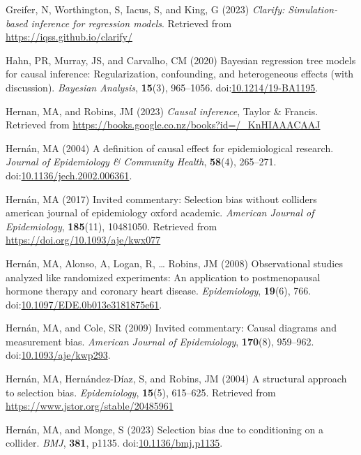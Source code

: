 \documentclass[
  singlecolumn]{article}
\newlength{\cslhangindent}
\newenvironment{CSLReferences}[2] %
 {\begin{list}{}{%
  \setlength{\itemindent}{0pt}
  \setlength{\leftmargin}{0pt}
  \setlength{\parsep}{0pt}
  \ifodd #1
   \setlength{\leftmargin}{\cslhangindent}
   \setlength{\itemindent}{-1\cslhangindent}
  \fi
  \setlength{\itemsep}{#2\baselineskip}}}
 {\end{list}}
\begin{document}
\begin{CSLReferences}{1}{0}
Greifer, N, Worthington, S, Iacus, S, and King, G (2023) \emph{Clarify:
Simulation-based inference for regression models}. Retrieved from
\url{https://iqss.github.io/clarify/}

Hahn, PR, Murray, JS, and Carvalho, CM (2020) Bayesian regression tree
models for causal inference: Regularization, confounding, and
heterogeneous effects (with discussion). \emph{Bayesian Analysis},
\textbf{15}(3), 965--1056.
doi:\href{https://doi.org/10.1214/19-BA1195}{10.1214/19-BA1195}.

Hernan, MA, and Robins, JM (2023) \emph{Causal inference}, Taylor \&
Francis. Retrieved from
\url{https://books.google.co.nz/books?id=/_KnHIAAACAAJ}

Hernán, MA (2004) A definition of causal effect for epidemiological
research. \emph{Journal of Epidemiology \& Community Health},
\textbf{58}(4), 265--271.
doi:\href{https://doi.org/10.1136/jech.2002.006361}{10.1136/jech.2002.006361}.

Hernán, MA (2017) Invited commentary: Selection bias without colliders
\textbar{} american journal of epidemiology \textbar{} oxford academic.
\emph{American Journal of Epidemiology}, \textbf{185}(11), 10481050.
Retrieved from \url{https://doi.org/10.1093/aje/kwx077}

Hernán, MA, Alonso, A, Logan, R, \ldots{} Robins, JM (2008)
Observational studies analyzed like randomized experiments: An
application to postmenopausal hormone therapy and coronary heart
disease. \emph{Epidemiology}, \textbf{19}(6), 766.
doi:\href{https://doi.org/10.1097/EDE.0b013e3181875e61}{10.1097/EDE.0b013e3181875e61}.

Hernán, MA, and Cole, SR (2009) Invited commentary: Causal diagrams and
measurement bias. \emph{American Journal of Epidemiology},
\textbf{170}(8), 959--962.
doi:\href{https://doi.org/10.1093/aje/kwp293}{10.1093/aje/kwp293}.

Hernán, MA, Hernández-Díaz, S, and Robins, JM (2004) A structural
approach to selection bias. \emph{Epidemiology}, \textbf{15}(5),
615--625. Retrieved from \url{https://www.jstor.org/stable/20485961}

Hernán, MA, and Monge, S (2023) Selection bias due to conditioning on a
collider. \emph{BMJ}, \textbf{381}, p1135.
doi:\href{https://doi.org/10.1136/bmj.p1135}{10.1136/bmj.p1135}.


\end{CSLReferences}
\end{document}
